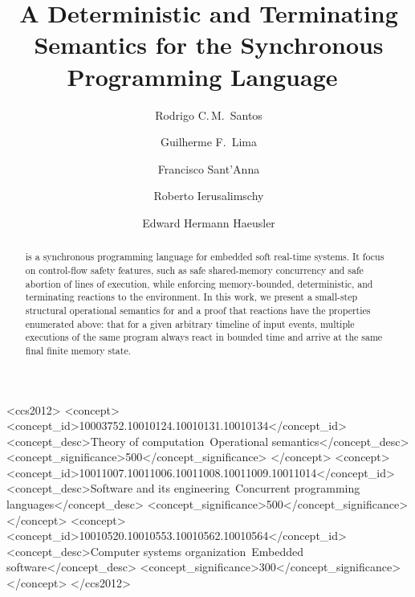 \documentclass[sigplan,anonymous,review,protrusion=true,expansion]{acmart}
\begin{document}
\title[A Memory-Bounded, Deterministic, and Terminating Semantics for \CEU]
{A Deterministic and Terminating Semantics
  for the Synchronous Programming Language~\CEU}

\author[R.\,C.\,M.~Santos]{Rodrigo C.\,M.~Santos}
%
\author[G.\,F.~Lima]{Guilherme F.~Lima}
%
\author[F.~Sant'Anna]{Francisco Sant'Anna}
%
\author[R.~Ierusalimschy]{Roberto Ierusalimschy}
%
\author[E.\,H.~Haeusler]{Edward Hermann Haeusler}

\begin{abstract}
\CEU is a synchronous programming language for embedded soft real-time systems.
%
It focus on control-flow safety features, such as safe shared-memory
concurrency and safe abortion of lines of execution, while enforcing
memory-bounded, deterministic, and terminating reactions to the environment.
%
In this work, we present a small-step structural operational semantics for
\CEU and a proof that reactions have the properties enumerated above:
%
that for a given arbitrary timeline of input events, multiple executions of the
same program always react in bounded time and arrive at the same final finite
memory state.
%
\end{abstract}


\begin{CCSXML}
<ccs2012>
 <concept>
  <concept_id>10003752.10010124.10010131.10010134</concept_id>
  <concept_desc>Theory of computation~Operational semantics</concept_desc>
  <concept_significance>500</concept_significance>
 </concept>
 <concept>
  <concept_id>10011007.10011006.10011008.10011009.10011014</concept_id>
  <concept_desc>Software and its
                engineering~Concurrent programming languages</concept_desc>
  <concept_significance>500</concept_significance>
 </concept>
 <concept>
  <concept_id>10010520.10010553.10010562.10010564</concept_id>
  <concept_desc>Computer systems
                organization~Embedded software</concept_desc>
  <concept_significance>300</concept_significance>
 </concept>
</ccs2012>
\end{CCSXML}

\maketitle











\end{document}
